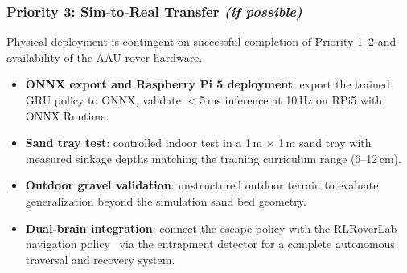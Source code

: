 \documentclass[12pt,a4paper]{article}
\begin{document}
\subsubsection{Priority 3: Sim-to-Real Transfer \textit{(if possible)}}

Physical deployment is contingent on successful completion of Priority 1--2 and availability of the AAU rover hardware.

\begin{itemize}
    \item \textbf{ONNX export and Raspberry Pi 5 deployment}: export the trained GRU policy to ONNX, validate $<$5\,ms inference at 10\,Hz on RPi5 with ONNX Runtime.
    \item \textbf{Sand tray test}: controlled indoor test in a 1\,m $\times$ 1\,m sand tray with measured sinkage depths matching the training curriculum range (6--12\,cm).
    \item \textbf{Outdoor gravel validation}: unstructured outdoor terrain to evaluate generalization beyond the simulation sand bed geometry.
    \item \textbf{Dual-brain integration}: connect the escape policy with the RLRoverLab navigation policy~\cite{rlroverlab} via the entrapment detector for a complete autonomous traversal and recovery system.
\end{itemize}
\end{document}

